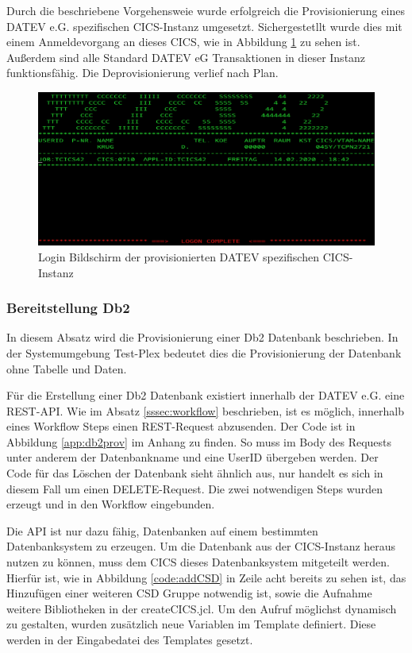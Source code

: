 Durch die beschriebene Vorgehensweie wurde erfolgreich die Provisionierung eines DATEV e.G. spezifischen CICS-Instanz umgesetzt.
Sichergestetllt wurde dies mit einem Anmeldevorgang an dieses CICS, wie in Abbildung \ref{fig:cicslogin} zu sehen ist.
Außerdem sind alle Standard DATEV eG Transaktionen in dieser Instanz funktionsfähig.
Die Deprovisionierung verlief nach Plan.

\begin{figure}[h]
	\centering
	\includegraphics[width=\textwidth]{figures/logonscreen.PNG}
	\caption{Login Bildschirm der provisionierten DATEV spezifischen CICS-Instanz}
	\label{fig:cicslogin}
\end{figure}

\subsubsection{Bereitstellung Db2}\label{sssec:db2tpl}
In diesem Absatz wird die Provisionierung einer Db2 Datenbank beschrieben.
In der Systemumgebung Test-Plex bedeutet dies die Provisionierung der Datenbank ohne Tabelle und Daten.

Für die Erstellung einer Db2 Datenbank existiert innerhalb der DATEV e.G. eine REST-API.
Wie im Absatz \ref{sssec:workflow} beschrieben, ist es möglich, innerhalb eines Workflow Steps einen REST-Request abzusenden.
Der Code ist in Abbildung \ref{app:db2prov} im Anhang zu finden.
So muss im Body des Requests unter anderem der Datenbankname und eine UserID übergeben werden.
Der Code für das Löschen der Datenbank sieht ähnlich aus, nur handelt es sich in diesem Fall um einen DELETE-Request.
Die zwei notwendigen Steps wurden erzeugt und in den Workflow eingebunden.

Die API ist nur dazu fähig, Datenbanken auf einem bestimmten Datenbanksystem zu erzeugen.
Um die Datenbank aus der CICS-Instanz heraus nutzen zu können, muss dem CICS dieses Datenbanksystem mitgeteilt werden.
Hierfür ist, wie in Abbildung \ref{code:addCSD} in Zeile acht bereits zu sehen ist, das Hinzufügen einer weiteren CSD Gruppe notwendig ist, sowie die Aufnahme weitere Bibliotheken in der \glqq createCICS.jcl\grqq.
Um den Aufruf möglichst dynamisch zu gestalten,  wurden zusätzlich neue Variablen im Template definiert.
Diese werden in der Eingabedatei des Templates gesetzt.

